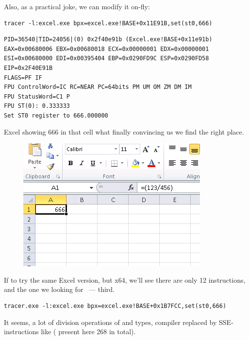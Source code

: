 {Also, as a practical joke, we can modify it on-fly:}

\begin{lstlisting}
tracer -l:excel.exe bpx=excel.exe!BASE+0x11E91B,set(st0,666)
\end{lstlisting}

\begin{lstlisting}
PID=36540|TID=24056|(0) 0x2f40e91b (Excel.exe!BASE+0x11e91b)
EAX=0x00680006 EBX=0x00680018 ECX=0x00000001 EDX=0x00000001
ESI=0x00680000 EDI=0x00395404 EBP=0x0290FD9C ESP=0x0290FD58
EIP=0x2F40E91B
FLAGS=PF IF
FPU ControlWord=IC RC=NEAR PC=64bits PM UM OM ZM DM IM 
FPU StatusWord=C1 P 
FPU ST(0): 0.333333
Set ST0 register to 666.000000
\end{lstlisting}

{Excel showing 666 in that cell what finally convincing us we find the right place.}

\begin{figure}[ht!]
\centering
\includegraphics[scale=0.66]{digging_into_code/Excel_prank.png}
\caption{}
\end{figure}

{If to try the same Excel version, but x64, we'll see there are only 12 \FDIV instructions,
and the one we looking for ~--- third.}

\begin{lstlisting}
tracer.exe -l:excel.exe bpx=excel.exe!BASE+0x1B7FCC,set(st0,666)
\end{lstlisting}

{It seems, a lot of division operations of \Tfloat and \Tdouble types, compiler replaced by SSE-instructions
like  ( present here 268 in total).}


